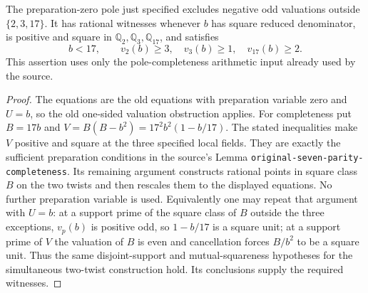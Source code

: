 \begin{lemma}
The preparation-zero pole just specified excludes negative odd
valuations outside $\{2,3,17\}$. It has rational witnesses whenever
$b$ has square reduced denominator, is positive and square in
$\mathbb Q_2,\mathbb Q_3,\mathbb Q_{17}$, and satisfies
\[
 b<17,\qquad v_2(b)\ge3,\quad v_3(b)\ge1,\quad v_{17}(b)\ge2.
\]
This assertion uses only the pole-completeness arithmetic input already
used by the source.
\end{lemma}
\begin{proof}
The equations are the old equations with preparation variable zero and
$U=b$, so the old one-sided valuation obstruction applies. For
completeness put $B=17b$ and $V=B(B-b^2)=17^2b^2(1-b/17)$.
The stated inequalities make $V$ positive and square at the three
specified local fields. They are exactly the sufficient preparation
conditions in the source's Lemma
\texttt{original-seven-parity-completeness}. Its remaining argument
constructs rational points in square class $B$ on the two twists and
then rescales them to the displayed equations. No further preparation
variable is used. Equivalently one may repeat that argument with
$U=b$: at a support prime of the square class of $B$ outside the three
exceptions, $v_p(b)$ is positive odd, so $1-b/17$ is a square unit;
at a support prime of $V$ the valuation of $B$ is even and cancellation
forces $B/b^2$ to be a square unit. Thus the same disjoint-support and
mutual-squareness hypotheses for the simultaneous two-twist construction
hold. Its conclusions supply the required witnesses.
\end{proof}

